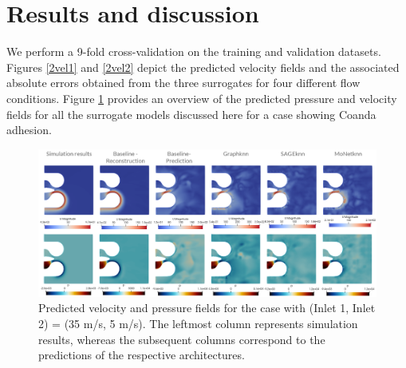 \section{Results and discussion}
We perform a 9-fold cross-validation on the training and validation datasets. Figures \ref{2vel1} and \ref{2vel2} depict the predicted velocity fields and the associated absolute errors obtained from the three surrogates for four different flow conditions. Figure \ref{aloop} provides an overview of the predicted pressure and velocity fields for all the surrogate models discussed here for a case showing Coanda adhesion. \\
\begin{figure}[ht]
    \centering
    \includegraphics[width=15cm]{images/Methodology/presvelcomp.png}
    \caption{Predicted velocity and pressure fields for the case with (Inlet 1, Inlet 2) = (35 m/s, 5 m/s). The leftmost column represents simulation results, whereas the subsequent columns correspond to the predictions of the respective architectures.} 
    \label{aloop}
\end{figure}
